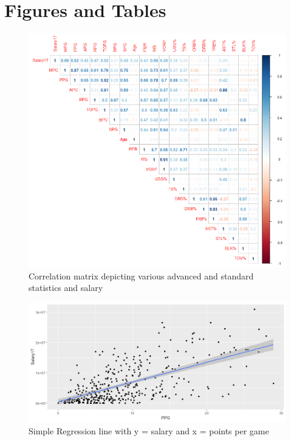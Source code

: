 \documentclass[12pt,english]{article}
\begin{document}
\vfill
\pagebreak{}
\begin{spacing}{1.0}


\end{spacing}

\vfill
\pagebreak{}
\clearpage

\section*{Figures and Tables}\label{sec:figTables}
\begin{figure}[ht]
\label{correlation}
\centering
\bigskip{}
\includegraphics[width=.9\linewidth]{Pics/1.png}
\caption{Correlation matrix depicting various advanced and standard statistics and salary}
\label{fig:fig1}
\end{figure}

\begin{figure}[ht]
\label{SalaryPPG}
\centering
\bigskip{}
\includegraphics[width=.9\linewidth]{Pics/Salary17yPPGxPlot.png}
\caption{Simple Regression line with y = salary and x = points per game}

\end{figure}
\end{document}
